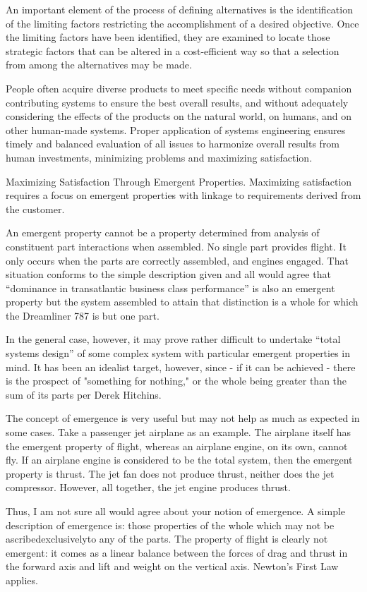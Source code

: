 An important element of the process of defining alternatives is the identification of the limiting factors restricting the accomplishment of a desired objective. Once the limiting factors have been identified, they are examined to locate those strategic factors that can be altered in a cost-efficient way so that a selection from among the alternatives may be made.

People often acquire diverse products to meet specific needs without companion contributing systems to ensure the best overall results, and without adequately considering the effects of the products on the natural world, on humans, and on other human-made systems. Proper application of systems engineering ensures timely and balanced evaluation of all issues to harmonize overall results from human investments, minimizing problems and maximizing satisfaction.

Maximizing Satisfaction Through Emergent Properties. Maximizing satisfaction requires a focus on emergent properties with linkage to requirements derived from the customer.

An emergent property cannot be a property determined from analysis of constituent part interactions when assembled. No single part provides flight. It only occurs when the parts are correctly assembled, and engines engaged. That situation conforms to the simple description given and all would agree that “dominance in transatlantic business class performance” is also an emergent property but the system assembled to attain that distinction is a whole for which the Dreamliner 787 is but one part.

In the general case, however, it may prove rather difficult to undertake ``total systems design'' of some complex system with particular emergent properties in mind. It has been an idealist target, however, since - if it can be achieved - there is the prospect of "something for nothing," or the whole being greater than the sum of its parts per Derek Hitchins.

The concept of emergence is very useful but may not help as much as expected in some cases. Take a passenger jet airplane as an example. The airplane itself has the emergent property of flight, whereas an airplane engine, on its own, cannot fly. If an airplane engine is considered to be the total system, then the emergent property is thrust. The jet fan does not produce thrust, neither does the jet compressor. However, all together, the jet engine produces thrust.

Thus, I am not sure all would agree about your notion of emergence. A simple description of emergence is: those properties of the whole which may not be ascribedexclusivelyto any of the parts. The property of flight is clearly not emergent: it comes as a linear balance between the forces of drag and thrust in the forward axis and lift and weight on the vertical axis. Newton's First Law applies.

